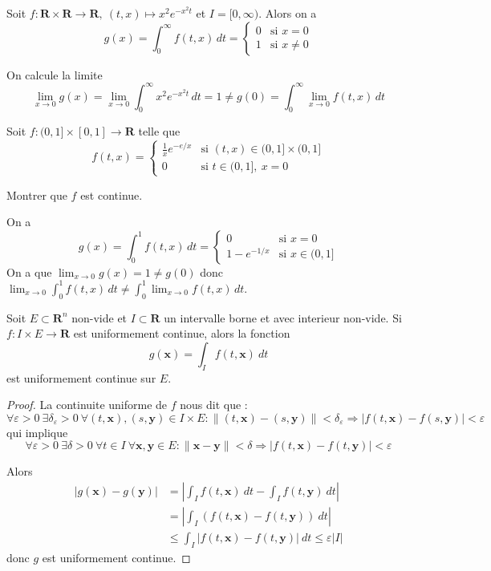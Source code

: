 \begin{example}
Soit $f:\mathbf{R}\times \mathbf{R}\to \mathbf{R},~(t,x)\mapsto x^{2}e^{-x^{2}t}$ et $I=[0,\infty)$. Alors on a
$$
g(x)=\int_{0}^{\infty}f(t,x)  \, dt=\begin{cases}
0 & \text{si }x=0 \\
1 & \text{si }x\neq 0
\end{cases} 
$$

On calcule la limite
$$
\lim_{ x \to 0 } g(x)=\lim_{ x\to0 }\int_{0}^{\infty} x^{2}e^{-x^{2}t} \, dt=1\neq g(0)=\int_{0}^{\infty} \lim_{ x \to 0 } f(t,x) \, dt   
$$
\end{example}
\begin{example}
Soit $f:(0,1]\times[0,1]\to \mathbf{R}$ telle que
$$
f(t,x)=\begin{cases}
\frac{1}{x}e^{-e/x} & \text{si }(t,x)\in(0,1]\times(0,1] \\
0 & \text{si }t\in(0,1],~x=0
\end{cases}
$$
\begin{exercise}
Montrer que $f$ est continue.
\end{exercise}

On a 
$$
g(x)=\int_{0}^{1} f(t,x) \, dt =\begin{cases}
0 & \text{si }x=0 \\
1-e^{-1/x} & \text{si }x \in(0,1]
\end{cases}
$$
On a que $\lim_{ x \to 0 }g(x)=1\neq g(0)$ donc $\lim_{ x \to 0 }\int_{0}^{1} f(t,x) \, dt\neq \int_{0}^{1} \lim_{ x \to 0 }f(t,x) \, dt$.
\end{example}
\begin{theorem}
Soit $E\subset \mathbf{R}^{n}$ non-vide et $I\subset \mathbf{R}$ un intervalle borne et avec interieur non-vide. Si $f:I\times E\to \mathbf{R}$ est uniformement continue, alors la fonction
$$
g(\boldsymbol{x})=\int _{I}f(t,\boldsymbol{x})~dt
$$
est uniformement continue sur $E$.
\end{theorem}
\begin{proof}
La continuite uniforme de $f$ nous dit que :
$$
\forall\varepsilon>0~\exists\delta _{\varepsilon}>0~\forall(t,\boldsymbol{x}),(s,\boldsymbol{y})\in I\times E:\lVert (t,\boldsymbol{x})-(s,\boldsymbol{y}) \rVert <\delta _{\varepsilon}\Rightarrow |f(t,\boldsymbol{x})-f(s,\boldsymbol{y})|<\varepsilon
$$
qui implique
$$
\forall\varepsilon>0~\exists\delta>0~\forall t\in I~\forall \boldsymbol{x},\boldsymbol{y}\in E:\lVert \boldsymbol{x}-\boldsymbol{y} \rVert <\delta \Rightarrow |f(t,\boldsymbol{x})-f(t,\boldsymbol{y})|<\varepsilon
$$

Alors 
\begin{align*}
|g(\boldsymbol{x})-g(\boldsymbol{y})| & =|\int _{I}f(t,\boldsymbol{x})~dt -\int _{I}f(t,\boldsymbol{y} )~dt| \\
 & =|\int _{I}(f(t,\boldsymbol{x})-f(t,\boldsymbol{y}))~dt| \\
 & \le \int _{I}|f(t,\boldsymbol{x})-f(t,\boldsymbol{y})|~dt \le \varepsilon |I|
\end{align*}
donc $g$ est uniformement continue.
\end{proof}
